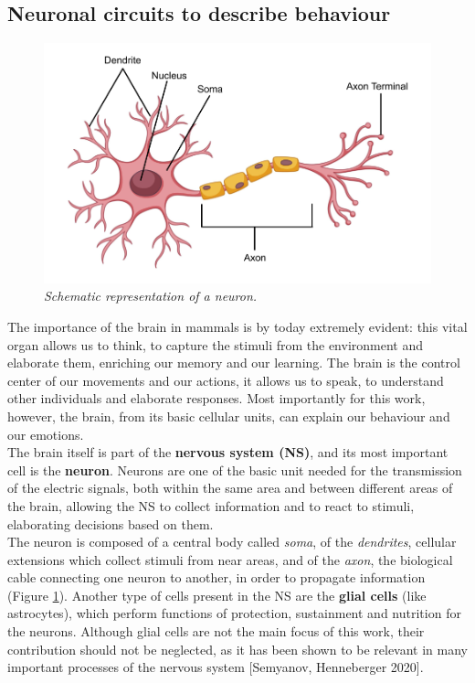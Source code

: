 \documentclass[12pt, a4paper]{article}
\begin{document}
	\subsection{Neuronal circuits to describe behaviour}
	
	\begin{figure}[H]
		\begin{center}
			\includegraphics[scale=.25]{neuron.png} 
		\end{center} 
		\caption{\textit{Schematic representation of a neuron.}} \label{neuron}
		
	\end{figure}
	
	The importance of the brain in mammals is by today extremely evident: this vital organ allows us to think,  to capture the stimuli from the environment and elaborate them, enriching our memory and  our learning. The brain is the control center of our movements and our actions, it allows us to speak, to understand other individuals and elaborate responses. Most importantly for this work, however, the brain, from its basic cellular units, can explain our behaviour and our emotions. \\

	
	The brain itself is part of the \textbf{nervous system (NS)}, and its most important cell is the \textbf{neuron}.	Neurons are one of the basic unit needed for the transmission of
	the electric signals, both within the same area and between different areas of
	the brain, allowing the NS to collect information and to react to stimuli,
	elaborating decisions based on them. \\
	The neuron is composed of a central body called \textit{soma}, of the \textit{dendrites}, cellular extensions which collect stimuli from near areas, and of the \textit{axon}, the biological cable connecting one neuron to another, in order to propagate information (Figure \ref{neuron}). 
	Another type of cells present in the NS are the \textbf{glial cells} (like astrocytes), which perform functions of protection, sustainment and nutrition for the neurons. Although glial cells are not the main focus of this work, their contribution should not be neglected, as it has been shown to be relevant in many important processes of the nervous system [Semyanov, Henneberger 2020]. \\
	
\end{document}
